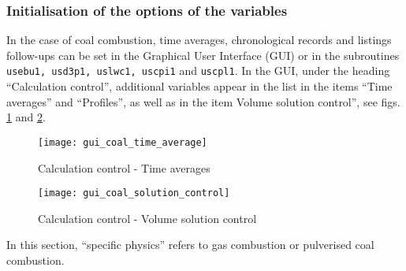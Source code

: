 {{{\subsubsection{Initialisation of the options of the variables}
In the case of coal combustion, time averages, chronological records and listings follow-ups can be set in the Graphical User Interface (GUI) or in the subroutines \texttt{usebu1, usd3p1, uslwc1, uscpi1} and \texttt{uscpl1}. In the GUI, under the heading ``Calculation control'', additional variables appear in the list in the items ``Time averages'' and ``Profiles'', as well as in the item Volume solution control'', see figs. \ref{fig:t_average-coal} and \ref{fig:V_control-coal}.

\begin{figure}[!ht]
\begin{center}
\texttt{[image: gui\_coal\_time\_average]}
\caption{Calculation control - Time averages}
\label{fig:t_average-coal}
\end{center}
\end{figure}

\begin{figure}[!ht]
\begin{center}
\texttt{[image: gui\_coal\_solution\_control]}
\caption{Calculation control - Volume solution control}
\label{fig:V_control-coal}
\end{center}
\end{figure}

In this section, ``specific physics'' refers to gas combustion or
pulverised coal combustion.

}}}
